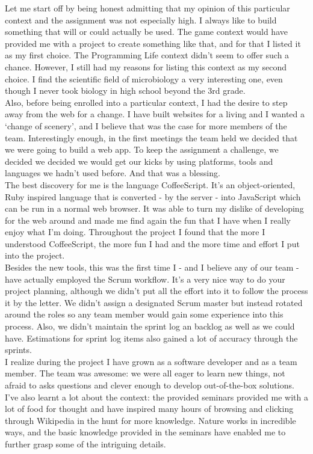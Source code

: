 Let me start off by being honest admitting that my opinion of this particular context and the assignment was not especially high. I always like to build something that will or could actually be used. The game context would have provided me with a project to create something like that, and for that I listed it as my first choice. The Programming Life context didn’t seem to offer such a chance. However, I still had my reasons for listing this context as my second choice. I find the scientific field of microbiology a very interesting one, even though I never took biology in high school beyond the 3rd grade. \\

Also, before being enrolled into a particular context, I had the desire to step away from the web for a change. I have built websites for a living and I wanted a ‘change of scenery’, and I believe that was the case for more members of the team. Interestingly enough, in the first meetings the team held we decided that we were going to build a web app. To keep the assignment a challenge, we decided we decided we would get our kicks by using platforms, tools and languages we hadn’t used before. And that was a blessing. \\

The best discovery for me is the language CoffeeScript. It’s an object-oriented, Ruby inspired language that is converted - by the server - into JavaScript which can be run in a normal web browser. It was able to turn my dislike of developing for the web around and made me find again the fun that I have when I really enjoy what I’m doing. Throughout the project I found that the more I understood CoffeeScript, the more fun I had and the more time and effort I put into the project. \\

Besides the new tools, this was the first time I - and I believe any of our team - have actually employed the Scrum workflow. It’s a very nice way to do your project planning, although we didn’t put all the effort into it to follow the process it by the letter. We didn’t assign a designated Scrum master but instead rotated around the roles so any team member would gain some experience into this process. Also, we didn’t maintain the sprint log an backlog as well as we could have. Estimations for sprint log items also gained a lot of accuracy through the sprints. \\

I realize during the project I have grown as a software developer and as a team member. The team was awesome: we were all eager to learn new things, not afraid to asks questions and clever enough to develop out-of-the-box solutions. I’ve also learnt a lot about the context: the provided seminars provided me with a lot of food for thought and have inspired many hours of browsing and clicking through Wikipedia in the hunt for more knowledge. Nature works in incredible ways, and the basic knowledge provided in the seminars have enabled me to further grasp some of the intriguing details.
